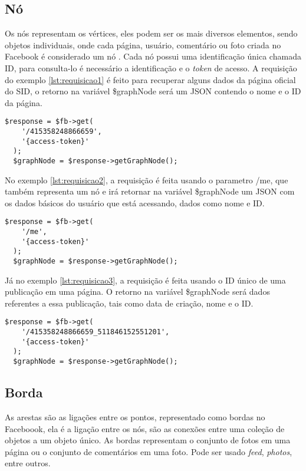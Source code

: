 \subsection{Nó}
Os nós representam os vértices, eles podem ser os mais diversos elementos, sendo objetos individuais, onde cada página, usuário, comentário ou foto criada no Facebook é considerado um nó \cite{facebook2018b}. Cada nó possui uma identificação única chamada ID, para consulta-lo é necessário a identificação e o \textit{token} de acesso. A requisição do exemplo \ref{lst:requisicao1} é feito para recuperar alguns dados da página oficial do SID, o retorno na variável \$graphNode será um JSON contendo o nome e o ID da página.

\begin{lstlisting}[caption={Requisitando dados básicos de uma página},label={lst:requisicao1}]
  $response = $fb->get(
    '/415358248866659',
    '{access-token}'
  );
  $graphNode = $response->getGraphNode();
\end{lstlisting}

No exemplo \ref{lst:requisicao2}, a requisição é feita usando o parametro /me, que também representa um nó e irá retornar na variável \$graphNode um JSON com os dados básicos do usuário que está acessando, dados como nome e ID.

\begin{lstlisting}[caption={Requisitando dados básicos de um usuário},label={lst:requisicao2}]
  $response = $fb->get(
    '/me',
    '{access-token}'
  );
  $graphNode = $response->getGraphNode();
\end{lstlisting}

Já no exemplo \ref{lst:requisicao3}, a requisição é feita usando o ID único de uma publicação em uma página. O retorno na variável \$graphNode será dados referentes a essa publicação, tais como data de criação, nome e o ID.

\begin{lstlisting}[caption={Requisitando dados básicos de uma publicação},label={lst:requisicao3}]
  $response = $fb->get(
    '/415358248866659_511846152551201',
    '{access-token}'
  );
  $graphNode = $response->getGraphNode();
\end{lstlisting}

\subsection{Borda}
As arestas são as ligações entre os pontos, representado como bordas no Faceboook, ela é a ligação entre os nós, são as conexões entre uma coleção de objetos a um objeto único. As bordas representam o conjunto de fotos em uma página ou o conjunto de comentários em uma foto. Pode ser usado \textit{feed}, \textit{photos}, entre outros.

